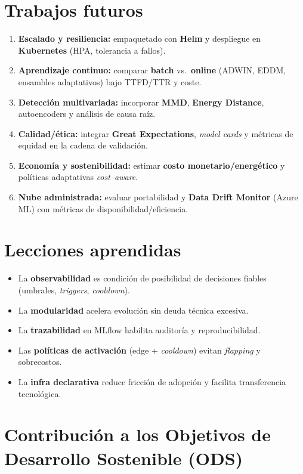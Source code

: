 \section{Trabajos futuros}
\begin{enumerate}\setlength\itemsep{2pt}
  \item \textbf{Escalado y resiliencia:} empaquetado con \textbf{Helm} y despliegue en \textbf{Kubernetes} (HPA, tolerancia a fallos).
  \item \textbf{Aprendizaje continuo:} comparar \textbf{batch} vs.\ \textbf{online} (ADWIN, EDDM, ensambles adaptativos) bajo TTFD/TTR y coste.
  \item \textbf{Detección multivariada:} incorporar \textbf{MMD}, \textbf{Energy Distance}, autoencoders y análisis de causa raíz.
  \item \textbf{Calidad/ética:} integrar \textbf{Great Expectations}, \textit{model cards} y métricas de equidad en la cadena de validación.
  \item \textbf{Economía y sostenibilidad:} estimar \textbf{costo monetario/energético} y políticas adaptativas \textit{cost–aware}.
  \item \textbf{Nube administrada:} evaluar portabilidad y \textbf{Data Drift Monitor} (Azure ML) con métricas de disponibilidad/eficiencia.
\end{enumerate}

\section{Lecciones aprendidas}
\begin{itemize}\setlength\itemsep{2pt}
  \item La \textbf{observabilidad} es condición de posibilidad de decisiones fiables (umbrales, \textit{triggers}, \textit{cooldown}).
  \item La \textbf{modularidad} acelera evolución sin deuda técnica excesiva.
  \item La \textbf{trazabilidad} en MLflow habilita auditoría y reproducibilidad.
  \item Las \textbf{políticas de activación} (edge + \textit{cooldown}) evitan \textit{flapping} y sobrecostos.
  \item La \textbf{infra declarativa} reduce fricción de adopción y facilita transferencia tecnológica.
\end{itemize}

\section{Contribución a los Objetivos de Desarrollo Sostenible (ODS)}
\label{sec:ods}

